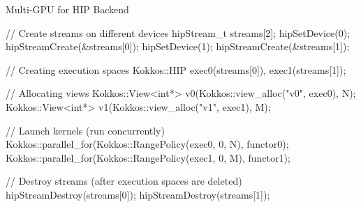 \begin{frame}[fragile]{Multi-GPU for HIP Backend}
  \begin{code}[keywords={auto}]
// Create streams on different devices
hipStream_t streams[2];
hipSetDevice(0); hipStreamCreate(&streams[0]);
hipSetDevice(1); hipStreamCreate(&streams[1]);
{
  // Creating execution spaces 
  Kokkos::HIP exec0(streams[0]), exec1(streams[1]);

  // Allocating views
  Kokkos::View<int*> v0(Kokkos::view_alloc("v0", exec0), N);
  Kokkos::View<int*> v1(Kokkos::view_alloc("v1", exec1), M);

  // Launch kernels (run concurrently)
  Kokkos::parallel_for(Kokkos::RangePolicy(exec0, 0, N), functor0);
  Kokkos::parallel_for(Kokkos::RangePolicy(exec1, 0, M), functor1);
}
// Destroy streams (after execution spaces are deleted)
hipStreamDestroy(streams[0]); hipStreamDestroy(streams[1]);
  \end{code}
\end{frame}

